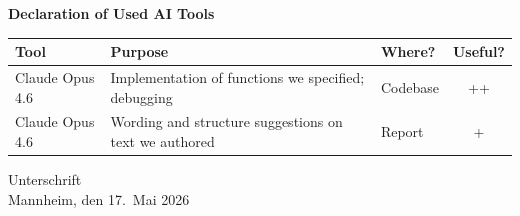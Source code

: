 \documentclass[a4paper,oneside,bibliography=totoc]{scrbook}
\begin{document}
\begin{center}
  \textbf{Declaration of Used AI Tools} \\[.3em]
  \begin{tabularx}{\textwidth}{lXlc}
    \toprule
    Tool & Purpose & Where? & Useful? \\
    \midrule
    Claude Opus 4.6 & Implementation of functions we specified; debugging & Codebase & ++ \\
        \midrule
    Claude Opus 4.6 & Wording and structure suggestions on text we authored & Report & + \\
    \bottomrule
  \end{tabularx}
\end{center}

\vspace{2cm}
\noindent Unterschrift\\
\noindent Mannheim, den 17.~Mai 2026 \hfill
\end{document}
